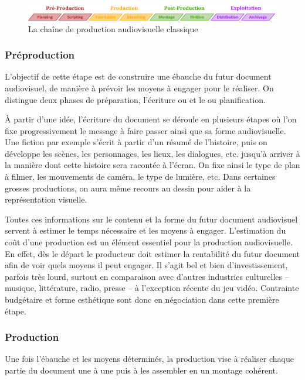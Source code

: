 \begin{figure}[ht!]
\centering
\includegraphics[width=\textwidth]{images/Workflow-Thesis-v0.png}
\caption{La chaîne de production audiovisuelle classique}
\label{img:intro:chaine}
\end{figure}


\subsubsection*{Préproduction}\label{sec:preprod}
L'objectif de cette étape est de construire une ébauche du futur document audiovisuel, de manière à prévoir les moyens à engager pour le réaliser. 
On distingue deux phases de préparation, l'écriture ou  et le  ou planification.

À partir d'une idée, l'écriture du document se déroule en plusieurs étapes où l'on fixe progressivement le message à faire passer ainsi que sa forme audiovisuelle. 
Une fiction par exemple s'écrit à partir d'un résumé de l'histoire, puis on développe les scènes, les personnages, les lieux, les dialogues, etc. jusqu'à arriver à la manière dont cette histoire sera racontée à l'écran. 
On fixe ainsi le type de plan à filmer, les mouvements de caméra, le type de lumière, etc. 
Dans certaines grosses productions, on aura même recours au dessin pour aider à la représentation visuelle.


Toutes ces informations sur le contenu et la forme du futur document audiovisuel servent à estimer le temps nécessaire et les moyens à engager. 
L'estimation du coût d'une production est un élément essentiel pour la production audiovisuelle. 
En effet, dès le départ le producteur doit estimer la rentabilité du futur document afin de voir quels moyens il peut engager. 
Il s'agit bel et bien d'investissement, parfois très lourd, surtout en comparaison avec d'autres industries culturelles – musique, littérature, radio, presse – à l'exception récente du jeu vidéo. 
Contrainte budgétaire et forme esthétique sont donc en négociation dans cette première étape.


\subsubsection*{Production}
Une fois l'ébauche et les moyens déterminés, la production vise à réaliser chaque partie du document une à une puis à les assembler en un montage cohérent.

